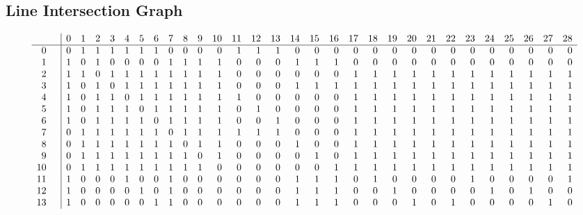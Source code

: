 \documentclass{article}
\begin{document}
{\subsection*{Line Intersection Graph}
{\arraycolsep=1pt
$$
\begin{array}{rr|*{29}r}
 &  & 0 & 1 & 2 & 3 & 4 & 5 & 6 & 7 & 8 & 9 & 10 & 11 & 12 & 13 & 14 & 15 & 16 & 17 & 18 & 19 & 20 & 21 & 22 & 23 & 24 & 25 & 26 & 27 & 28\\
\hline
0 &  & 0 & 1 & 1 & 1 & 1 & 1 & 1 & 0 & 0 & 0 & 0 & 1 & 1 & 1 & 0 & 0 & 0 & 0 & 0 & 0 & 0 & 0 & 0 & 0 & 0 & 0 & 0 & 0 & 0\\
1 &  & 1 & 0 & 1 & 0 & 0 & 0 & 0 & 1 & 1 & 1 & 1 & 0 & 0 & 0 & 1 & 1 & 1 & 0 & 0 & 0 & 0 & 0 & 0 & 0 & 0 & 0 & 0 & 0 & 0\\
2 &  & 1 & 1 & 0 & 1 & 1 & 1 & 1 & 1 & 1 & 1 & 1 & 0 & 0 & 0 & 0 & 0 & 0 & 1 & 1 & 1 & 1 & 1 & 1 & 1 & 1 & 1 & 1 & 1 & 1\\
3 &  & 1 & 0 & 1 & 0 & 1 & 1 & 1 & 1 & 1 & 1 & 1 & 0 & 0 & 0 & 1 & 1 & 1 & 1 & 1 & 1 & 1 & 1 & 1 & 1 & 1 & 1 & 1 & 1 & 1\\
4 &  & 1 & 0 & 1 & 1 & 0 & 1 & 1 & 1 & 1 & 1 & 1 & 1 & 0 & 0 & 0 & 0 & 0 & 1 & 1 & 1 & 1 & 1 & 1 & 1 & 1 & 1 & 1 & 1 & 1\\
5 &  & 1 & 0 & 1 & 1 & 1 & 0 & 1 & 1 & 1 & 1 & 1 & 0 & 1 & 0 & 0 & 0 & 0 & 1 & 1 & 1 & 1 & 1 & 1 & 1 & 1 & 1 & 1 & 1 & 1\\
6 &  & 1 & 0 & 1 & 1 & 1 & 1 & 0 & 1 & 1 & 1 & 1 & 0 & 0 & 1 & 0 & 0 & 0 & 1 & 1 & 1 & 1 & 1 & 1 & 1 & 1 & 1 & 1 & 1 & 1\\
7 &  & 0 & 1 & 1 & 1 & 1 & 1 & 1 & 0 & 1 & 1 & 1 & 1 & 1 & 1 & 0 & 0 & 0 & 1 & 1 & 1 & 1 & 1 & 1 & 1 & 1 & 1 & 1 & 1 & 1\\
8 &  & 0 & 1 & 1 & 1 & 1 & 1 & 1 & 1 & 0 & 1 & 1 & 0 & 0 & 0 & 1 & 0 & 0 & 1 & 1 & 1 & 1 & 1 & 1 & 1 & 1 & 1 & 1 & 1 & 1\\
9 &  & 0 & 1 & 1 & 1 & 1 & 1 & 1 & 1 & 1 & 0 & 1 & 0 & 0 & 0 & 0 & 1 & 0 & 1 & 1 & 1 & 1 & 1 & 1 & 1 & 1 & 1 & 1 & 1 & 1\\
10 &  & 0 & 1 & 1 & 1 & 1 & 1 & 1 & 1 & 1 & 1 & 0 & 0 & 0 & 0 & 0 & 0 & 1 & 1 & 1 & 1 & 1 & 1 & 1 & 1 & 1 & 1 & 1 & 1 & 1\\
11 &  & 1 & 0 & 0 & 0 & 1 & 0 & 0 & 1 & 0 & 0 & 0 & 0 & 0 & 0 & 1 & 1 & 1 & 0 & 1 & 0 & 0 & 0 & 0 & 1 & 0 & 0 & 0 & 0 & 1\\
12 &  & 1 & 0 & 0 & 0 & 0 & 1 & 0 & 1 & 0 & 0 & 0 & 0 & 0 & 0 & 1 & 1 & 1 & 0 & 0 & 1 & 0 & 0 & 0 & 0 & 1 & 0 & 1 & 0 & 0\\
13 &  & 1 & 0 & 0 & 0 & 0 & 0 & 1 & 1 & 0 & 0 & 0 & 0 & 0 & 0 & 1 & 1 & 1 & 0 & 0 & 0 & 1 & 0 & 1 & 0 & 0 & 0 & 0 & 1 & 0\\

\end{array}$$}}
\end{document}
